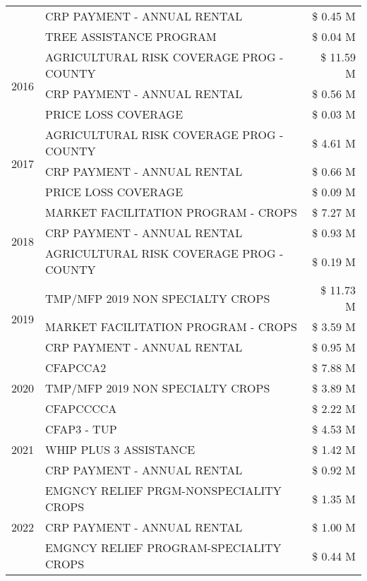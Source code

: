 \begin{tabular}{llr}
 & CRP PAYMENT - ANNUAL RENTAL & \$ 0.45 M \\
 & TREE ASSISTANCE PROGRAM & \$ 0.04 M \\
\cline{1-3}
\multirow[t]{3}{*}{2016} & AGRICULTURAL RISK COVERAGE PROG - COUNTY & \$ 11.59 M \\
 & CRP PAYMENT - ANNUAL RENTAL & \$ 0.56 M \\
 & PRICE LOSS COVERAGE & \$ 0.03 M \\
\cline{1-3}
\multirow[t]{3}{*}{2017} & AGRICULTURAL RISK COVERAGE PROG - COUNTY & \$ 4.61 M \\
 & CRP PAYMENT - ANNUAL RENTAL & \$ 0.66 M \\
 & PRICE LOSS COVERAGE & \$ 0.09 M \\
\cline{1-3}
\multirow[t]{3}{*}{2018} & MARKET FACILITATION PROGRAM - CROPS & \$ 7.27 M \\
 & CRP PAYMENT - ANNUAL RENTAL & \$ 0.93 M \\
 & AGRICULTURAL RISK COVERAGE PROG - COUNTY & \$ 0.19 M \\
\cline{1-3}
\multirow[t]{3}{*}{2019} & TMP/MFP 2019 NON SPECIALTY CROPS & \$ 11.73 M \\
 & MARKET FACILITATION PROGRAM - CROPS & \$ 3.59 M \\
 & CRP PAYMENT - ANNUAL RENTAL & \$ 0.95 M \\
\cline{1-3}
\multirow[t]{3}{*}{2020} & CFAPCCA2 & \$ 7.88 M \\
 & TMP/MFP 2019 NON SPECIALTY CROPS & \$ 3.89 M \\
 & CFAPCCCCA & \$ 2.22 M \\
\cline{1-3}
\multirow[t]{3}{*}{2021} & CFAP3 - TUP & \$ 4.53 M \\
 & WHIP PLUS 3 ASSISTANCE & \$ 1.42 M \\
 & CRP PAYMENT - ANNUAL RENTAL & \$ 0.92 M \\
\cline{1-3}
\multirow[t]{3}{*}{2022} & EMGNCY RELIEF PRGM-NONSPECIALITY CROPS & \$ 1.35 M \\
 & CRP PAYMENT - ANNUAL RENTAL & \$ 1.00 M \\
 & EMGNCY RELIEF PROGRAM-SPECIALITY CROPS & \$ 0.44 M \\
\cline{1-3}
\bottomrule
\end{tabular}
